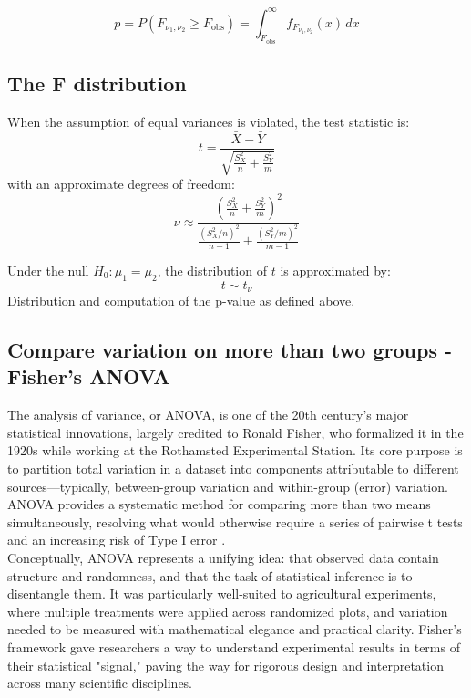 \documentclass{book}
\begin{document}
\[
p = P(F_{\nu_1, \nu_2} \geq F_{\text{obs}}) = \int_{F_{\text{obs}}}^{\infty} f_{F_{\nu_1, \nu_2}}(x)\,dx
\]

\subsection*{The F distribution}

When the assumption of equal variances is violated, the test statistic is:
\[
t = \frac{\bar{X} - \bar{Y}}{\sqrt{\frac{S_X^2}{n} + \frac{S_Y^2}{m}}}
\]
with an approximate degrees of freedom:
\[
\nu \approx \frac{\left(\frac{S_X^2}{n} + \frac{S_Y^2}{m}\right)^2}{\frac{(S_X^2/n)^2}{n - 1} + \frac{(S_Y^2/m)^2}{m - 1}}
\]

Under the null \( H_0: \mu_1 = \mu_2 \), the distribution of \( t \) is approximated by:
\[
t \sim t_{\nu}
\]
Distribution and computation of the p-value as defined above.

\newpage

\subsection{Compare variation on more than two groups - Fisher's ANOVA}

The analysis of variance, or ANOVA, is one of the 20th century's major statistical innovations, largely credited to Ronald Fisher, who formalized it in the 1920s while working at the Rothamsted Experimental Station. Its core purpose is to partition total variation in a dataset into components attributable to different sources—typically, between-group variation and within-group (error) variation. ANOVA provides a systematic method for comparing more than two means simultaneously, resolving what would otherwise require a series of pairwise t tests and an increasing risk of Type I error 
\cite{fisher1925}.\\

Conceptually, ANOVA represents a unifying idea: that observed data contain structure and randomness, and that the task of statistical inference is to disentangle them. It was particularly well-suited to agricultural experiments, where multiple treatments were applied across randomized plots, and variation needed to be measured with mathematical elegance and practical clarity. Fisher’s framework gave researchers a way to understand experimental results in terms of their statistical "signal," paving the way for rigorous design and interpretation across many scientific disciplines.\\
\end{document}
